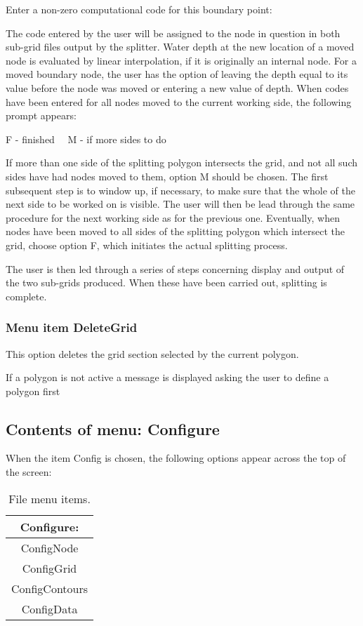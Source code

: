 \documentclass{article}
\begin{document}
Enter a non-zero computational code for this boundary point:

The code entered by the user will be assigned to the node in question in both sub-grid files output by the splitter. Water depth at the new location of a moved node is evaluated by linear interpolation, if it is originally an internal node. For a moved boundary node, the user has the option of leaving the depth equal to its value before the node was moved or entering a new value of depth. When codes have been entered for all nodes moved to the current working side, the following prompt appears:

F - finished \ \ M - if more sides to do

If more than one side of the splitting polygon intersects the grid, and not all such sides have had nodes moved to them, option M should be chosen. The first subsequent step is to window up, if necessary, to make sure that the whole of the next side to be worked on is visible. The user will then be lead through the same procedure for the next working side as for the previous one. Eventually, when nodes have been moved to all sides of the splitting polygon which intersect the grid, choose option F, which initiates the actual splitting process.

The user is then led through a series of steps concerning display and output of the two sub-grids produced. When these have been carried out, splitting is complete.

\subsubsection[Menu item DeleteGrid]{Menu item DeleteGrid}
This option deletes the grid section selected by the current polygon.

If a polygon is not active a message is displayed asking the user to define a polygon first



\subsection{Contents of menu: Configure}
When the item Config is chosen, the following options appear across the top of the screen:

\begin{table}[htb!]
 \caption{File menu items.}
  \begin{center}
   \begin{tabular}{|c|}
    \hline
Configure:\\     \hline
ConfigNode \\
ConfigGrid \\
ConfigContours \\
ConfigData \\
    \hline
   \end{tabular}
   \label{tab:CONFIGURE}
  \end{center}
\end{table}
\end{document}

